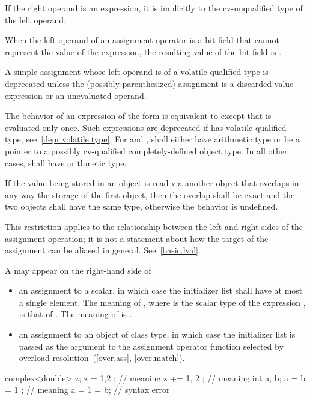\pnum
{}%
If the right operand is an expression, it is implicitly
 to the cv-unqualified type of the left
operand.

\pnum
{}%
When the left operand of an assignment operator
is a bit-field that cannot represent the value of the expression, the
resulting value of the bit-field is
.

\pnum
A simple assignment whose left operand is of
a volatile-qualified type is deprecated
unless the (possibly parenthesized) assignment is a discarded-value expression or
an unevaluated operand.

\pnum
The behavior of an expression of the form 
is equivalent to  except
that  is evaluated only once.
Such expressions are deprecated
if  has volatile-qualified type; see~\ref{depr.volatile.type}.
For \tcode{+=} and \tcode{-=},
 shall either have arithmetic type or be a pointer to a
possibly cv-qualified completely-defined object type. In all other
cases,  shall have arithmetic type.

\pnum
If the value being stored in an object is read via another object that
overlaps in any way the storage of the first object, then the overlap shall be
exact and the two objects shall have the same type, otherwise the behavior is
undefined.
\begin{note}
This restriction applies to the relationship
between the left and right sides of the assignment operation; it is not a
statement about how the target of the assignment can be aliased in general.
See~\ref{basic.lval}.
\end{note}

\pnum
A  may appear on the right-hand side of
\begin{itemize}
\item an assignment to a scalar, in which case the initializer list shall have
at most a single element. The meaning of , where  is the
scalar type of the expression , is that of . The meaning of
 is .

\item an assignment to an object of class type, in which case the initializer
list is passed as the argument to the assignment operator function selected by
overload resolution~(\ref{over.ass}, \ref{over.match}).
\end{itemize}
\begin{example}
\begin{codeblock}
complex<double> z;
z = { 1,2 };        // meaning 
z += { 1, 2 };      // meaning 
int a, b;
a = b = { 1 };      // meaning 
a = { 1 } = b;      // syntax error
\end{codeblock}
\end{example}

